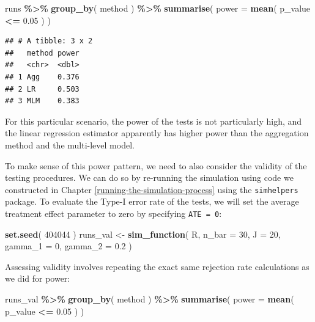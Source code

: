 \documentclass[
]{book}
\newenvironment{Shaded}{\begin{snugshade}}{\end{snugshade}}
\newcommand{\AttributeTok}[1]{\textcolor[rgb]{0.13,0.29,0.53}{#1}}
\newcommand{\DecValTok}[1]{\textcolor[rgb]{0.00,0.00,0.81}{#1}}
\newcommand{\FloatTok}[1]{\textcolor[rgb]{0.00,0.00,0.81}{#1}}
\newcommand{\FunctionTok}[1]{\textcolor[rgb]{0.13,0.29,0.53}{\textbf{#1}}}
\newcommand{\NormalTok}[1]{#1}
\newcommand{\OtherTok}[1]{\textcolor[rgb]{0.56,0.35,0.01}{#1}}
\newcommand{\SpecialCharTok}[1]{\textcolor[rgb]{0.81,0.36,0.00}{\textbf{#1}}}
\begin{document}
\begin{Shaded}
\begin{Highlighting}[]
\NormalTok{runs }\SpecialCharTok{\%\textgreater{}\%} 
  \FunctionTok{group\_by}\NormalTok{( method ) }\SpecialCharTok{\%\textgreater{}\%}
  \FunctionTok{summarise}\NormalTok{( }\AttributeTok{power =} \FunctionTok{mean}\NormalTok{( p\_value }\SpecialCharTok{\textless{}=} \FloatTok{0.05}\NormalTok{ ) )}
\end{Highlighting}
\end{Shaded}

\begin{verbatim}
## # A tibble: 3 x 2
##   method power
##   <chr>  <dbl>
## 1 Agg    0.376
## 2 LR     0.503
## 3 MLM    0.383
\end{verbatim}

For this particular scenario, the power of the tests is not particularly high, and the linear regression estimator apparently has higher power than the aggregation method and the multi-level model.

To make sense of this power pattern, we need to also consider the validity of the testing procedures.
We can do so by re-running the simulation using code we constructed in Chapter \ref{running-the-simulation-process} using the \texttt{simhelpers} package.
To evaluate the Type-I error rate of the tests, we will set the average treatment effect parameter to zero by specifying \texttt{ATE\ =\ 0}:

\begin{Shaded}
\begin{Highlighting}[]
\FunctionTok{set.seed}\NormalTok{( }\DecValTok{404044}\NormalTok{ )}
\NormalTok{runs\_val }\OtherTok{\textless{}{-}} \FunctionTok{sim\_function}\NormalTok{( R, }\AttributeTok{n\_bar =} \DecValTok{30}\NormalTok{, }\AttributeTok{J =} \DecValTok{20}\NormalTok{, }\AttributeTok{gamma\_1 =} \DecValTok{0}\NormalTok{, }\AttributeTok{gamma\_2 =} \FloatTok{0.2}\NormalTok{ )}
\end{Highlighting}
\end{Shaded}

Assessing validity involves repeating the exact same rejection rate calculations as we did for power:

\begin{Shaded}
\begin{Highlighting}[]
\NormalTok{runs\_val }\SpecialCharTok{\%\textgreater{}\%} 
  \FunctionTok{group\_by}\NormalTok{( method ) }\SpecialCharTok{\%\textgreater{}\%}
  \FunctionTok{summarise}\NormalTok{( }\AttributeTok{power =} \FunctionTok{mean}\NormalTok{( p\_value }\SpecialCharTok{\textless{}=} \FloatTok{0.05}\NormalTok{ ) )}
\end{Highlighting}
\end{Shaded}
\end{document}
